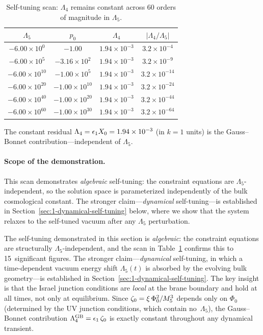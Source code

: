 \begin{table}[h]
\centering
\caption{Self-tuning scan: $\Lambda_4$ remains constant across 60 orders of magnitude in $\Lambda_5$.}
\label{tab:1-self-tuning}
\begin{tabular}{@{}cccc@{}}
\toprule
$\Lambda_5$ & $p_0$ & $\Lambda_4$ & $|\Lambda_4/\Lambda_5|$ \\
\midrule
$-6.00 \times 10^{0}$ & $-1.00$ & $1.94 \times 10^{-3}$ & $3.2 \times 10^{-4}$ \\
$-6.00 \times 10^{5}$ & $-3.16 \times 10^{2}$ & $1.94 \times 10^{-3}$ & $3.2 \times 10^{-9}$ \\
$-6.00 \times 10^{10}$ & $-1.00 \times 10^{5}$ & $1.94 \times 10^{-3}$ & $3.2 \times 10^{-14}$ \\
$-6.00 \times 10^{20}$ & $-1.00 \times 10^{10}$ & $1.94 \times 10^{-3}$ & $3.2 \times 10^{-24}$ \\
$-6.00 \times 10^{40}$ & $-1.00 \times 10^{20}$ & $1.94 \times 10^{-3}$ & $3.2 \times 10^{-44}$ \\
$-6.00 \times 10^{60}$ & $-1.00 \times 10^{30}$ & $1.94 \times 10^{-3}$ & $3.2 \times 10^{-64}$ \\
\bottomrule
\end{tabular}
\end{table}

\noindent The constant residual $\Lambda_4 = \epsilon_1 X_0 = 1.94 \times 10^{-3}$ (in $k = 1$ units) is the Gauss--Bonnet contribution---independent of $\Lambda_5$.

\paragraph{Scope of the demonstration.} This scan demonstrates \emph{algebraic} self-tuning: the constraint equations are $\Lambda_5$-independent, so the solution space is parameterized independently of the bulk cosmological constant. The stronger claim---\emph{dynamical} self-tuning---is established in Section~\ref{sec:1-dynamical-self-tuning} below, where we show that the system relaxes to the self-tuned vacuum after any $\Lambda_5$ perturbation.

\begin{remark}
\label{rem:1-algebraic-self-tuning}
The self-tuning demonstrated in this section is \emph{algebraic}: the constraint equations are structurally $\Lambda_5$-independent, and the scan in Table~\ref{tab:1-self-tuning} confirms this to 15~significant figures. The stronger claim---\emph{dynamical} self-tuning, in which a time-dependent vacuum energy shift $\Lambda_5(t)$ is absorbed by the evolving bulk geometry---is established in Section~\ref{sec:1-dynamical-self-tuning}. The key insight is that the Israel junction conditions are \emph{local} at the brane boundary and hold at all times, not only at equilibrium. Since $\zeta_0 = \xi\,\Phi_0^2/M_5^3$ depends only on $\Phi_0$ (determined by the UV junction conditions, which contain no~$\Lambda_5$), the Gauss--Bonnet contribution $\Lambda_4^{\mathrm{GB}} = \epsilon_1\,\zeta_0$ is exactly constant throughout any dynamical transient.
\end{remark}


